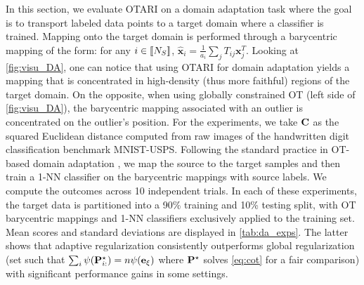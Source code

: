 In this section, we evaluate OTARI on a domain adaptation task where the goal is to transport labeled data points to a target domain where a classifier is trained. Mapping onto the target domain is performed through a barycentric mapping of the form: for any $i \in {[\![N_S]\!]}$, $\hat{\bm{x}}_i = \frac{1}{a_i} \sum_j T_{ij} \bm{x}_j^T$.
Looking at \cref{fig:visu_DA}, one can notice that using OTARI for domain adaptation yields a mapping that is concentrated in high-density (thus more faithful) regions of the target domain. On the opposite, when using globally constrained OT (left side of \cref{fig:visu_DA}), the barycentric mapping associated with an outlier is concentrated on the outlier's position. For the experiments, we take $\mathbf{C}$ as the squared Euclidean distance computed from raw images of the handwritten digit classification benchmark MNIST-USPS. 
Following the standard practice in OT-based domain adaptation \cite{flamary2016optimal}, we map the source to the target samples and then train a 1-NN classifier on the barycentric mappings with source labels.
We compute the outcomes across 10 independent trials. In each of these experiments, the target data is partitioned into a 90\% training and 10\% testing split, with OT barycentric mappings and 1-NN classifiers exclusively applied to the training set. Mean scores and standard deviations are displayed in \cref{tab:da_exps}. The latter shows that adaptive regularization consistently outperforms global regularization (set such that $\sum_i \psi({\mathbf{P}}^\star_{i:}) = n \psi(\mathbf{e}_{\xi})$ where ${\mathbf{P}}^\star$ solves \ref{eq:cot} for a fair comparison) with significant performance gains in some settings.